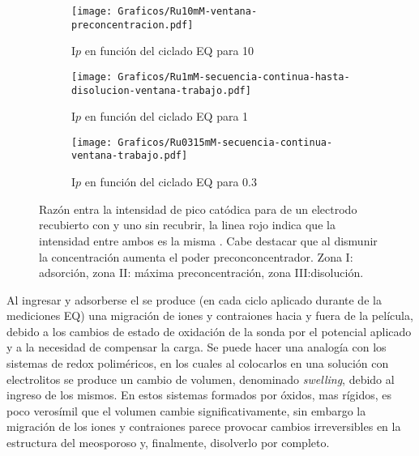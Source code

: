 		 	\begin{figure}[th]
	 	   	    \begin{subfigure}[t]{0.325\textwidth}
		        	\texttt{[image: Graficos/Ru10mM-ventana-preconcentracion.pdf]}
		       		\caption{I$p$ en función del ciclado EQ para \ru \SI{10}{\milli\Molar}}
		         	\label{fig:Ventana_Ru10mM}
		     		\end{subfigure}
	     		\begin{subfigure}[t]{0.325\textwidth}
		        	\texttt{[image: Graficos/Ru1mM-secuencia-continua-hasta-disolucion-ventana-trabajo.pdf]}
		       		\caption{I$p$  en función del ciclado EQ para \ru \SI{1}{\milli\Molar}}
		         	\label{fig:Ventana_Ru1mM}
		     		\end{subfigure}
	     		\begin{subfigure}[t]{0.325\textwidth}
		        	\texttt{[image: Graficos/Ru0315mM-secuencia-continua-ventana-trabajo.pdf]}
		       		\caption{I$p$ en función del ciclado EQ para \ru \SI{0.3}{\milli\Molar}}
		         	\label{fig:Ventana_Ru0315mM}
		     		\end{subfigure}
	 	   	   	\caption[Intensidad en función del ciclado EQ]{Razón entra la intensidad de pico catódica para \ru\space de un electrodo recubierto con \pdm\space y uno sin recubrir, la linea rojo indica que la intensidad entre ambos es la misma . Cabe destacar que al dismunir la concentración aumenta el poder preconconcentrador. Zona I: adsorción, zona II: máxima preconcentración, zona III:disolución.}
	     		\label{fig:ventanas}
	     	  \end{figure}


		Al ingresar y adsorberse el \ru\space se produce (en cada ciclo aplicado durante de la mediciones EQ) una migración de iones y contraiones hacia y fuera de la película, debido a los cambios de estado de oxidación de la sonda por el potencial aplicado y a la necesidad de compensar la carga.  Se puede hacer una analogía con los sistemas de redox poliméricos, en los cuales al colocarlos en una solución con electrolitos se produce un cambio de volumen, denominado \textit{swelling}, debido al ingreso de los mismos\cite{Ybarra2005}. En estos sistemas formados por óxidos, mas rígidos, es poco verosímil que el volumen cambie significativamente, sin embargo la migración de los iones y contraiones parece provocar cambios irreversibles en la estructura del meosporoso y, finalmente, disolverlo por completo.


